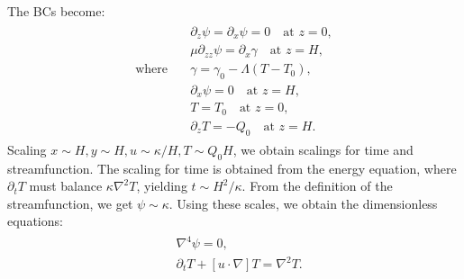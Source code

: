 \documentclass{article}
\begin{document}
The BCs become:
\begin{align}
 \label{eq:marangoni_convect_bcs_dim}
 \begin{split}
  & \partial_{z}\psi = \partial_{x}\psi = 0 \quad \textrm{at } z = 0,\\
  & \mu \partial_{zz} \psi = \partial_{x}\gamma \quad \textrm{at } z = H,\\
  \textrm{where}\quad & \gamma = \gamma_{0}-\Lambda(T-T_{0}),\\
  & \partial_{x}\psi = 0 \quad \textrm{at } z = H, \\
  & T=T_{0} \quad \textrm{at } z = 0, \\
  & \partial_{z}T = -Q_{0} \quad \textrm{at } z = H.
 \end{split}
\end{align}
%
Scaling $x\sim H, y\sim H, u \sim \kappa/H, T\sim Q_{0}H$, we obtain scalings for time and streamfunction. The scaling for time is obtained from the energy equation, where $\partial_{t}T$ must balance $\kappa \nabla^{2}T$, yielding $t \sim H^{2}/\kappa$. From the definition of the streamfunction, we get $\psi \sim  \kappa$. Using these scales, we obtain the dimensionless equations:
\begin{align}
\label{eq:marangoni_convect_gov_eqns_dimless}
 \begin{split}
  &\nabla^{4}\psi = 0, \\
  & \partial_{t}T + [u \cdot \nabla]T  = \nabla^{2}T.
 \end{split}
\end{align}
\end{document}
